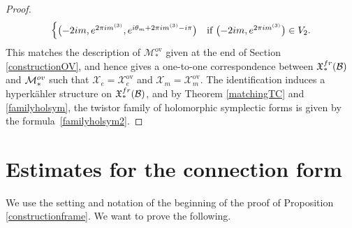 \documentclass[11pt]{article}
\numberwithin{equation}{section}
\numberwithin{equation}{section}
\begin{document}
\begin{proof}
\begin{equation*}
\begin{cases}
 \bigl(-2{\rm i}m,{\rm e}^{2\pi {\rm i} m^{(3)}},{\rm e}^{{\rm i}\theta_m +2\pi {\rm i} m^{(3)}-{\rm i}\pi}\bigr) &
 \text{if}\ \bigl(-2{\rm i}m,{\rm e}^{2\pi {\rm i} m^{(3)}}\bigr)\in V_2.
 \end{cases}
\end{equation*}
This matches the description of $\mathcal{M}^{\text{ov}}_*$ given at the end of Section \ref{constructionOV}, and hence gives a one-to-one correspondence between $\mathfrak{X}^{\textnormal{fr}}_*(\mathcal{B})$ and $\mathcal{M}^{\textnormal{ov}}_*$ such that $\mathcal{X}_e=\mathcal{X}_e^{\text{ov}}$ and $\mathcal{X}_m=\mathcal{X}_m^{\text{ov}}$. The identification induces a hyperk\"ahler structure on $\mathfrak{X}_*^{{\rm fr}}(\mathcal{B})$, and by Theorem \ref{matchingTC} and \eqref{familyholsym}, the twistor family of holomorphic symplectic forms is given by the formula~\eqref{familyholsym2}.
\end{proof}

\appendix\setcounter{section}{0}
\section{Estimates for the connection form}\label{AA}

We use the setting and notation of the beginning of the proof of Proposition \ref{constructionframe}. We want to prove the following.
\end{document}
